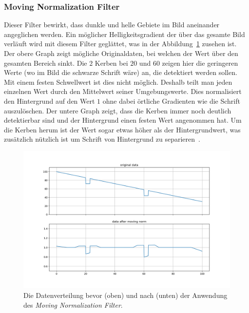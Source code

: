 \documentclass[sigconf]{acmart}
\begin{document}
\subsubsection{Moving Normalization Filter}
Dieser Filter bewirkt, dass dunkle und helle Gebiete im Bild
aneinander angeglichen werden. Ein möglicher Helligkeitsgradient der
über das gesamte Bild verläuft wird mit diesem Filter geglättet, was 
in der Abbildung~\ref{fig:effect_moving_norm} zusehen ist. Der obere Graph zeigt mögliche
Originaldaten, bei welchen der Wert über den gesamten Bereich
sinkt. Die $2$ Kerben bei $20$ und $60$ zeigen hier die geringeren
Werte (wo im Bild die schwarze Schrift wäre) an, die detektiert werden
sollen. Mit einem festen Schwellwert ist dies nicht möglich. Deshalb
teilt man jeden einzelnen Wert durch den Mittelwert seiner
Umgebungswerte. Dies normalisiert den Hintergrund auf den Wert $1$
ohne dabei örtliche Gradienten wie die Schrift auszulöschen. Der
untere Graph zeigt, dass die Kerben immer noch deutlich detektierbar
sind und der Hintergrund einen festen Wert angenommen hat. Um die
Kerben herum ist der Wert sogar etwas höher als der Hintergrundwert,
was zusätzlich nützlich ist um Schrift von Hintergrund zu separieren~\cite{guenl2021}.

\begin{figure}[htbp]
  \centering
  \includegraphics[width=0.7\linewidth]{./graphics/effect_moving_norm.png}
  \caption{Die Datenverteilung bevor (oben) und nach (unten) der
    Anwendung des \emph{Moving Normalization Filter}.}
  \label{fig:effect_moving_norm}
\end{figure}
\end{document}
